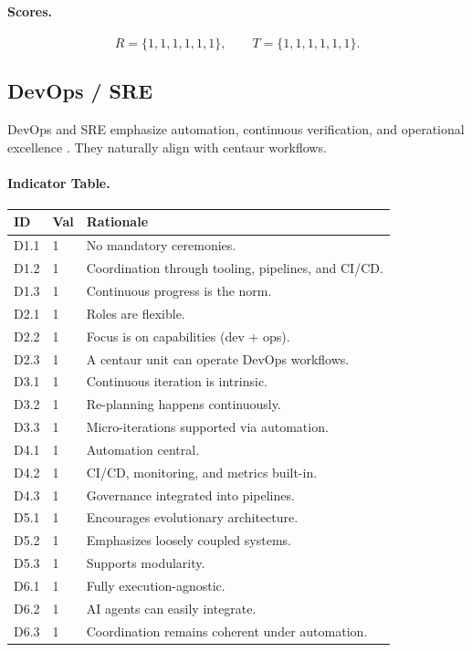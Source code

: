 \documentclass[11pt, a4paper, twocolumn]{article} %
\begin{document}
\paragraph{Scores.}

\[
R = \{1,1,1,1,1,1\},\qquad
T = \{1,1,1,1,1,1\}.
\]

\newpage
\subsection*{DevOps / SRE}

DevOps and SRE emphasize automation, continuous verification, and operational
excellence \citep{forsgren2018accelerate,humble2015leanenterprise}. They
naturally align with centaur workflows.

\paragraph{Indicator Table.}

\begin{table}[h]
\centering
\begin{tabular}{llp{10.5cm}}
\toprule
\textbf{ID} & \textbf{Val} & \textbf{Rationale} \\
\midrule
D1.1 & 1 & No mandatory ceremonies. \\
D1.2 & 1 & Coordination through tooling, pipelines, and CI/CD. \\
D1.3 & 1 & Continuous progress is the norm. \\
\midrule
D2.1 & 1 & Roles are flexible. \\
D2.2 & 1 & Focus is on capabilities (dev + ops). \\
D2.3 & 1 & A centaur unit can operate DevOps workflows. \\
\midrule
D3.1 & 1 & Continuous iteration is intrinsic. \\
D3.2 & 1 & Re-planning happens continuously. \\
D3.3 & 1 & Micro-iterations supported via automation. \\
\midrule
D4.1 & 1 & Automation central. \\
D4.2 & 1 & CI/CD, monitoring, and metrics built-in. \\
D4.3 & 1 & Governance integrated into pipelines. \\
\midrule
D5.1 & 1 & Encourages evolutionary architecture. \\
D5.2 & 1 & Emphasizes loosely coupled systems. \\
D5.3 & 1 & Supports modularity. \\
\midrule
D6.1 & 1 & Fully execution-agnostic. \\
D6.2 & 1 & AI agents can easily integrate. \\
D6.3 & 1 & Coordination remains coherent under automation. \\
\bottomrule
\end{tabular}
\end{table}
\end{document}
